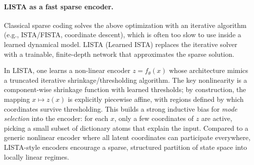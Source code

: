 \documentclass{article}
\begin{document}

\paragraph{LISTA as a fast sparse encoder.}
Classical sparse coding solves the above optimization with an iterative algorithm (e.g., ISTA/FISTA, coordinate descent), which is often too slow to use inside a learned dynamical model.
LISTA (Learned ISTA) \citep{gregor_learning_2010} replaces the iterative solver with a trainable, finite-depth network that approximates the sparse solution.

In LISTA, one learns a non-linear encoder $z = f_\theta(x)$ whose architecture mimics a truncated iterative shrinkage/thresholding algorithm.
The key nonlinearity is a component-wise shrinkage function with learned thresholds; by construction, the mapping $x \mapsto z(x)$ is explicitly piecewise affine, with regions defined by which coordinates survive thresholding.
This builds a strong inductive bias for \emph{mode selection} into the encoder: for each $x$, only a few coordinates of $z$ are active, picking a small subset of dictionary atoms that explain the input.
Compared to a generic nonlinear encoder where all latent coordinates can participate everywhere, LISTA-style encoders encourage a sparse, structured partition of state space into locally linear regimes.


\end{document}
